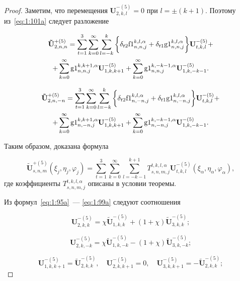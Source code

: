 \begin{proof}
Заметим, что перемещения $\mathbf{U}_{2,k,l}^{-(5)}=0$ при $l=\pm(k+1)$. Поэтому из~\eqref{eq:1:101a} следует разложение

\begin{multline}
\mathbf{\tilde U}_{2,n,n}^{+(5)}=\sum\limits_{t=1}^3\sum\limits_{k=0}^\infty\sum\limits_{l=-k}^{k}\bigg\{\delta_{t2}{\rm f1}_{n,n,j}^{k,l,\alpha}+\delta_{t1}{\rm g1}_{n,n,j}^{k,l,\alpha}\bigg\}\mathbf{U}_{t,k,l}^{-(5)}+ \\
+\sum\limits_{k=0}^\infty{\rm g1}_{n,n,j}^{k,k+1,\alpha}\mathbf{U}_{1,k,k+1}^{-(5)}+\sum\limits_{k=0}^\infty{\rm g1}_{n,n,j}^{k,-k-1,\alpha}\mathbf{U}_{1,k,-k-1}^{-(5)}.
\label{eq:1:112p}
\end{multline}

\begin{multline}
\mathbf{\tilde U}_{2,n,-n}^{+(5)}=\sum\limits_{t=1}^3\sum\limits_{k=0}^\infty\sum\limits_{l=-k}^{k}\bigg\{\delta_{t2}{\rm f1}_{n,-n,j}^{k,l,\alpha}+\delta_{t1}{\rm g1}_{n,-n,j}^{k,l,\alpha}\bigg\}\mathbf{U}_{t,k,l}^{-(5)}+ \\
+\sum\limits_{k=0}^\infty{\rm g1}_{n,-n,j}^{k,k+1,\alpha}\mathbf{U}_{1,k,k+1}^{-(5)}+\sum\limits_{k=0}^\infty{\rm g1}_{n,-n,j}^{k,-k-1,\alpha}\mathbf{U}_{1,k,-k-1}^{-(5)}.
\label{eq:1:113p}
\end{multline}

Таким образом, доказана формула

\begin{equation}
\mathbf{\tilde U}_{s,n,m}^{+(5)}(\xi_j,\eta_j,\varphi_j)=\sum\limits_{t=1}^3\sum\limits_{k=0}^\infty\sum\limits_{l=-k-1}^{k+1}T_{s,n,m,j}^{t,k,l,\alpha}\mathbf{U}_{t,k,l}^{-(5)}(\xi_\alpha,\eta_\alpha,\varphi_\alpha),
\label{eq:1:114p}
\end{equation}
где коэффициенты $T_{s,n,m,j}^{t,k,l,\alpha}$ описаны в условии теоремы.

Из формул~\eqref{eq:1:95a}~--- \eqref{eq:1:99a} следуют соотношения

\begin{equation}
\mathbf{U}_{2,k,k}^{-(5)}=\chi\mathbf{\tilde U}_{1,k,k}^{-(5)}+(1+\chi)\mathbf{\tilde U}_{3,k,k}^{-(5)};
\label{eq:1:115p}
\end{equation}

\begin{equation}
\mathbf{U}_{2,k,-k}^{-(5)}=\chi\mathbf{\tilde U}_{1,k,-k}^{-(5)}-(1+\chi)\mathbf{\tilde U}_{3,k,-k}^{-(5)};
\label{eq:1:116p}
\end{equation}

\begin{equation}
\mathbf{U}_{1,k,k+1}^{-(5)}=\mathbf{\tilde U}_{2,k,k}^{-(5)},\quad\mathbf{U}_{2,k,k+1}^{-(5)}=0,\quad\mathbf{U}_{3,k,k+1}^{-(5)}=-\mathbf{\tilde U}_{2,k,k}^{-(5)};
\label{eq:1:117p}
\end{equation}


\end{proof}

